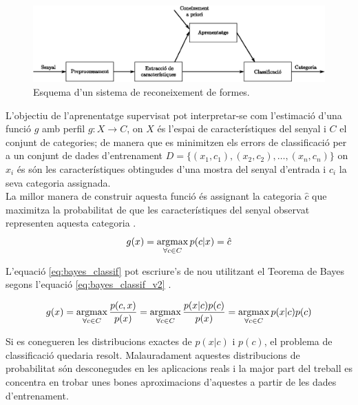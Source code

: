\begin{figure}
\centering
\includegraphics[width=\textwidth]{images/rf.eps}
\caption{Esquema d'un sistema de reconeixement de formes.}
\label{fig:rf}
\end{figure}

L'objectiu de l'aprenentatge supervisat pot interpretar-se com l'estimació d'una funció $g$ amb perfil $g : X \rightarrow C$, on $X$ és l'espai de característiques del senyal i $C$ el conjunt de categories; de manera que es minimitzen els errors de classificació per a un conjunt de dades d'entrenament $D = \{(x_1, c_1), (x_2, c_2), \ldots, (x_n, c_n)\}$ on $x_i$ és són les característiques obtingudes d'una mostra del senyal d'entrada i $c_i$ la seva categoria assignada. \\

La millor manera de construir aquesta funció és assignant la categoria $\hat{c}$ que maximitza la probabilitat de que les característiques del senyal observat representen aquesta categoria \cite{DH73}.
\begin{equation}\label{eq:bayes_classif}
g(x) = \operatorname*{argmax}_{\forall c \in C} p(c|x) = \hat{c}
\end{equation}

L'equació \ref{eq:bayes_classif} pot escriure's de nou utilitzant el Teorema de Bayes segons l'equació \ref{eq:bayes_classif_v2} \cite{Bayes01011763}.

\begin{equation}\label{eq:bayes_classif_v2}
g(x) = \operatorname*{argmax}_{\forall c \in C} \frac{p(c,x)}{p(x)} = \operatorname*{argmax}_{\forall c \in C} \frac{p(x|c) p(c)}{p(x)} = \operatorname*{argmax}_{\forall c \in C} p(x|c) p(c)
\end{equation}

Si es conegueren les distribucions exactes de $p(x|c)$ i $p(c)$, el problema de classificació quedaria resolt. Malauradament aquestes distribucions de probabilitat són desconegudes en les aplicacions reals i la major part del treball es concentra en trobar unes bones aproximacions d'aquestes a partir de les dades d'entrenament.

